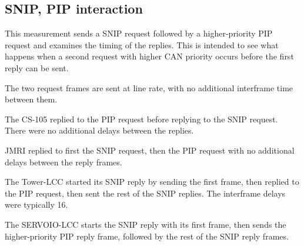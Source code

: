 \documentclass[11pt]{article}
\begin{document}
\clearpage


\subsection{SNIP, PIP interaction}

This measurement sends a SNIP request followed by a higher-priority PIP request and 
examines the timing of the replies.
This is intended to see what happens when a second request with higher CAN priority occurs 
before the first reply can be sent.

The two request frames are sent at line rate, with no additional interframe time
between them.

The CS-105 replied to the PIP request before replying to the SNIP request. There were
no additional delays between the replies.

JMRI replied to first the SNIP request, then the PIP request with no additional
delays between the reply frames.

The Tower-LCC started its SNIP reply by sending the first frame, then replied to the 
PIP request, then sent the rest of the SNIP replies.  The interframe delays were 
typically 16\us.

The SERVOIO-LCC starts the SNIP reply with its first frame,
then sends the higher-priority PIP reply frame, 
followed by the rest of the SNIP reply frames.
\end{document}
